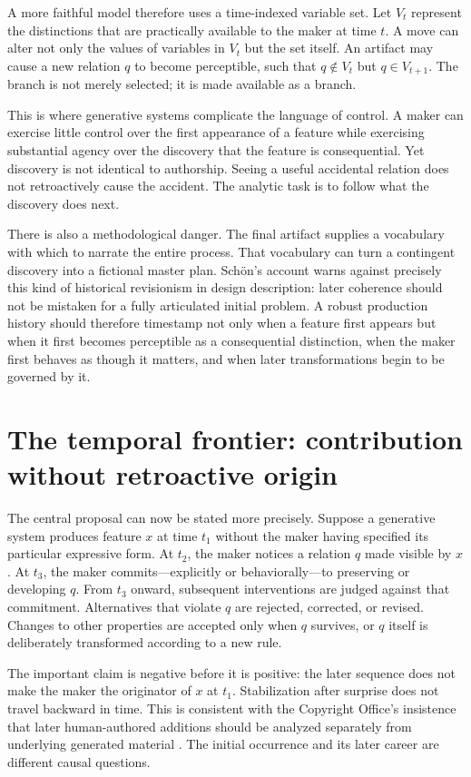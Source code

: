 \documentclass[11pt]{article}
\begin{document}
A more faithful model therefore uses a time-indexed variable set. Let $V_t$ represent the distinctions that are practically available to the maker at time $t$. A move can alter not only the values of variables in $V_t$ but the set itself. An artifact may cause a new relation $q$ to become perceptible, such that $q \notin V_t$ but $q \in V_{t+1}$. The branch is not merely selected; it is made available as a branch.

This is where generative systems complicate the language of control. A maker can exercise little control over the first appearance of a feature while exercising substantial agency over the discovery that the feature is consequential. Yet discovery is not identical to authorship. Seeing a useful accidental relation does not retroactively cause the accident. The analytic task is to follow what the discovery does next.

There is also a methodological danger. The final artifact supplies a vocabulary with which to narrate the entire process. That vocabulary can turn a contingent discovery into a fictional master plan. Sch\"on's account warns against precisely this kind of historical revisionism in design description: later coherence should not be mistaken for a fully articulated initial problem. A robust production history should therefore timestamp not only when a feature first appears but when it first becomes perceptible as a consequential distinction, when the maker first behaves as though it matters, and when later transformations begin to be governed by it.

\section{The temporal frontier: contribution without retroactive origin}

The central proposal can now be stated more precisely. Suppose a generative system produces feature $x$ at time $t_1$ without the maker having specified its particular expressive form. At $t_2$, the maker notices a relation $q$ made visible by $x$. At $t_3$, the maker commits---explicitly or behaviorally---to preserving or developing $q$. From $t_3$ onward, subsequent interventions are judged against that commitment. Alternatives that violate $q$ are rejected, corrected, or revised. Changes to other properties are accepted only when $q$ survives, or $q$ itself is deliberately transformed according to a new rule.

The important claim is negative before it is positive: the later sequence does not make the maker the originator of $x$ at $t_1$. Stabilization after surprise does not travel backward in time. This is consistent with the Copyright Office's insistence that later human-authored additions should be analyzed separately from underlying generated material \citep{USCO2025Copyrightability,AllenGov2026Brief}. The initial occurrence and its later career are different causal questions.
\end{document}
